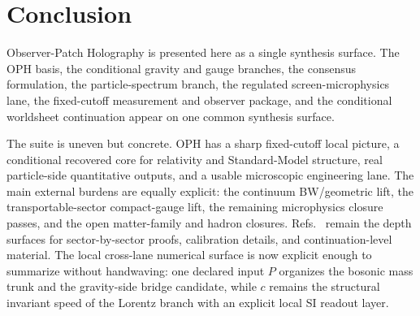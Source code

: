 \section{Conclusion}

Observer-Patch Holography is presented here as a single synthesis surface. The OPH basis, the
conditional gravity and gauge branches, the consensus formulation, the particle-spectrum branch,
the regulated screen-microphysics lane, the fixed-cutoff measurement and observer package, and the
conditional worldsheet continuation appear on one common synthesis surface.

The suite is uneven but concrete. OPH has a sharp
fixed-cutoff local picture, a conditional recovered core for relativity and Standard-Model
structure, real particle-side quantitative outputs, and a usable microscopic engineering lane. The
main external burdens are equally explicit: the continuum BW/geometric lift, the
transportable-sector compact-gauge lift, the remaining microphysics closure passes, and the open
matter-family and hadron closures. Refs.~\cite{ophcompact,ophconsensus,ophmicrophysics,ophparticles} remain the depth surfaces for
sector-by-sector proofs, calibration details, and continuation-level material. The local
cross-lane numerical surface is now explicit enough to summarize without handwaving: one
declared input \(P\) organizes the bosonic mass trunk and the gravity-side bridge candidate,
while \(c\) remains the structural invariant speed of the Lorentz branch with an explicit local
SI readout layer.
